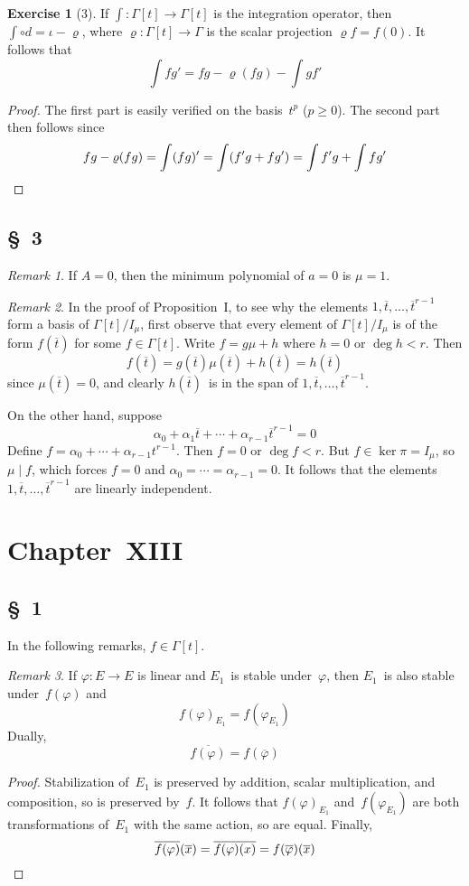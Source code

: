 \documentclass[letterpaper,12pt]{article}
\newcommand{\divides}{\mid}
\newcommand{\after}{\circ}
\newcommand{\proj}[1]{\overline{#1}}
\theoremstyle{definition}
\newtheorem*{exer}{Exercise}
\theoremstyle{remark}
\newtheorem*{rmk}{Remark}
\begin{document}
\begin{exer}[3]
If \(\int:\Gamma[t]\to\Gamma[t]\) is the integration operator, then \(\int\after d=\iota-\varrho\), where \(\varrho:\Gamma[t]\to\Gamma\) is the scalar projection \(\varrho f=f(0)\). It follows that
\[\int fg'=fg-\varrho(fg)-\int gf'\]
\end{exer}
\begin{proof}
The first part is easily verified on the basis~\(t^p\) (\(p\ge 0\)). The second part then follows since
\[fg-\varrho(fg)=\int(fg)'=\int(f'g+fg')=\int f'g+\int fg'\qedhere\]
\end{proof}

\subsection*{\S~3}
\begin{rmk}
If \(A=0\), then the minimum polynomial of \(a=0\) is \(\mu=1\).
\end{rmk}

\begin{rmk}
In the proof of Proposition~I, to see why the elements \(1,\proj{t},\ldots,\proj{t}^{r-1}\) form a basis of \(\Gamma[t]/I_{\mu}\), first observe that every element of \(\Gamma[t]/I_{\mu}\) is of the form \(f(\proj{t})\) for some \(f\in\Gamma[t]\). Write \(f=g\mu+h\) where \(h=0\) or \(\deg h<r\). Then
\[f(\proj{t})=g(\proj{t})\mu(\proj{t})+h(\proj{t})=h(\proj{t})\]
since \(\mu(\proj{t})=0\), and clearly \(h(\proj{t})\)~is in the span of \(1,\proj{t},\ldots,\proj{t}^{r-1}\).

On the other hand, suppose
\[\alpha_0+\alpha_1\proj{t}+\cdots+\alpha_{r-1}\proj{t}^{r-1}=0\]
Define \(f=\alpha_0+\cdots+\alpha_{r-1}t^{r-1}\). Then \(f=0\) or \(\deg f<r\). But \(f\in\ker\pi=I_{\mu}\), so \(\mu\divides f\), which forces \(f=0\) and \(\alpha_0=\cdots=\alpha_{r-1}=0\). It follows that the elements \(1,\proj{t},\ldots,\proj{t}^{r-1}\) are linearly independent.
\end{rmk}

\section*{Chapter~XIII}
\subsection*{\S~1}
In the following remarks, \(f\in\Gamma[t]\).
\begin{rmk}
If \(\varphi:E\to E\) is linear and \(E_1\)~is stable under~\(\varphi\), then \(E_1\)~is also stable under~\(f(\varphi)\) and
\[f(\varphi)_{E_1}=f(\varphi_{E_1})\]
Dually,
\[\proj{f(\varphi)}=f(\proj{\varphi})\]
\end{rmk}
\begin{proof}
Stabilization of~\(E_1\) is preserved by addition, scalar multiplication, and composition, so is preserved by~\(f\). It follows that \(f(\varphi)_{E_1}\) and~\(f(\varphi_{E_1})\) are both transformations of~\(E_1\) with the same action, so are equal. Finally,
\[\proj{f(\varphi)}(\proj{x})=\proj{f(\varphi)(x)}=f(\proj{\varphi})(\proj{x})\qedhere\]
\end{proof}
\end{document}
